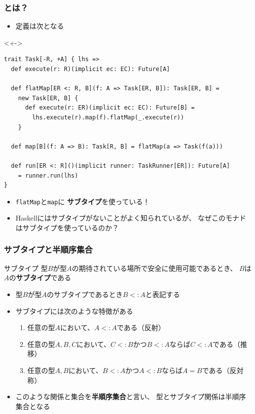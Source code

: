 \begin{frame}[fragile]
  \frametitle{\Fujitask とは？}

  \begin{itemize}
    \item<+-> 定義は次となる
  \end{itemize}

  \begin{uncoverenv}<+->
\begin{lstlisting}[style=scala]
trait Task[-R, +A] { lhs =>
  def execute(r: R)(implicit ec: EC): Future[A]

  def flatMap[ER <: R, B](f: A => Task[ER, B]): Task[ER, B] =
    new Task[ER, B] {
      def execute(r: ER)(implicit ec: EC): Future[B] =
        lhs.execute(r).map(f).flatMap(_.execute(r))
    }

  def map[B](f: A => B): Task[R, B] = flatMap(a => Task(f(a)))

  def run[ER <: R]()(implicit runner: TaskRunner[ER]): Future[A]
    = runner.run(lhs)
}
\end{lstlisting}
  \end{uncoverenv}

  \begin{itemize}
    \item<+-> \lstinline|flatMap|と\lstinline|map|に
    \textbf{サブタイプ}を使っている！

    \item<+-> Haskellにはサブタイプがないことがよく知られているが、
    なぜこのモナドはサブタイプを使っているのか？
  \end{itemize}
\end{frame}

\begin{frame}
  \frametitle{サブタイプと半順序集合}

  \pause
  \begin{block}{サブタイプ}
    型$B$が型$A$の期待されている場所で安全に使用可能であるとき、
    $B$は$A$の\textbf{サブタイプ}である

    \begin{itemize}
      \item 型$B$が型$A$のサブタイプであるとき$B <: A$と表記する
    \end{itemize}
  \end{block}

  \pause
  \begin{itemize}
    \item<+-> サブタイプには次のような特徴がある
    \begin{enumerate}
      \item<+-> 任意の型$A$において、$A <: A$である（反射）
      \item<+-> 任意の型$A, B, C$において、$C <: B$かつ$B <: A$ならば$C <: A$である（推移）
      \item<+-> 任意の型$A, B$において、$B <: A$かつ$A <: B$ならば$A = B$である（反対称）
    \end{enumerate}

    \item<+-> このような関係と集合を\textbf{半順序集合}と言い、
    型とサブタイプ関係は半順序集合となる
  \end{itemize}
\end{frame}

